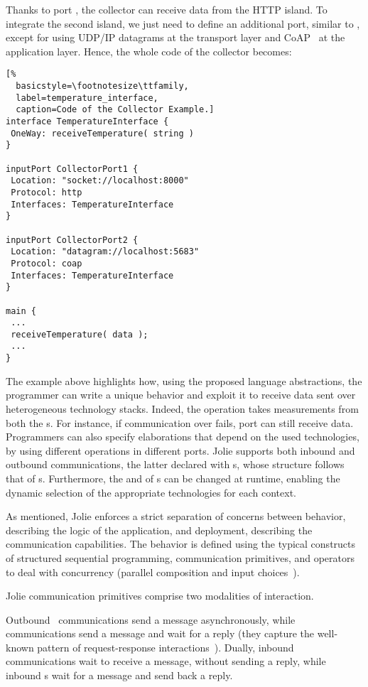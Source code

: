 Thanks to port , the collector can receive data from the
HTTP island. To integrate the second island, we just need to define an
additional port, similar to , except for using UDP/IP
datagrams at the transport layer and CoAP~\cite{doi:10.17487/RFC7252,coap} at the application layer. Hence, the
whole code of the collector becomes:
%
\begin{lstlisting}[%
  basicstyle=\footnotesize\ttfamily,
  label=temperature_interface,
  caption=Code of the Collector Example.]
interface TemperatureInterface {
 OneWay: receiveTemperature( string )
}

inputPort CollectorPort1 {
 Location: "socket://localhost:8000"
 Protocol: http
 Interfaces: TemperatureInterface
}

inputPort CollectorPort2 {
 Location: "datagram://localhost:5683"
 Protocol: coap
 Interfaces: TemperatureInterface
}

main {
 ...
 receiveTemperature( data );
 ...
}
\end{lstlisting}
%
The example above highlights how, using the proposed language abstractions, the
programmer can write a unique behavior and exploit it to receive data sent over
heterogeneous technology stacks. Indeed, the 
operation takes measurements from both the s.
%
For instance, if communication over  fails, port
 can still receive data.
%
Programmers can also specify elaborations that depend on the used technologies,
by using different operations in different ports.
Jolie supports both inbound and outbound
communications, the latter declared with s, whose structure
follows that of s. Furthermore, the  and
 of s can be changed at runtime, enabling the
dynamic selection of the appropriate technologies for each context.

As mentioned, Jolie enforces a strict separation of concerns between behavior,
describing the logic of the application, and deployment, describing the
communication capabilities. The behavior is defined using the typical
constructs of structured sequential programming, communication primitives, and
operators to deal with concurrency (parallel composition and input
choices~\cite{MontesiGZ14}).

Jolie communication primitives comprise two modalities of interaction.

Outbound~ communications send a message asynchronously, while
 communications send a message and wait for a reply (they
capture the well-known pattern of request-response
interactions~\cite{req-rep}). Dually, inbound  communications wait
to receive a message, without sending a reply, while inbound s wait for a message
and send back a reply.

